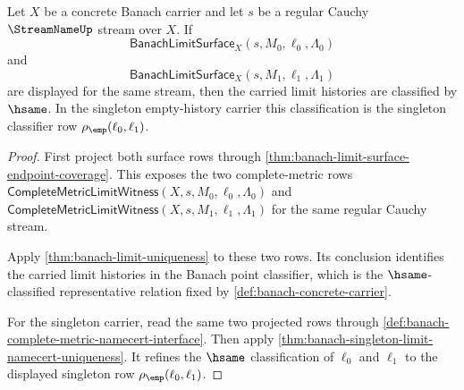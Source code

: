 \begin{theorem}
\label{thm:banach-limit-surface-uniqueness}
Let $X$ be a concrete Banach carrier and let $s$ be a regular Cauchy
$\StreamNameUp$ stream over $X$. If
$$
\mathsf{BanachLimitSurface}_X(s,M_0,\ell_0,\Lambda_0)
$$
and
$$
\mathsf{BanachLimitSurface}_X(s,M_1,\ell_1,\Lambda_1)
$$
are displayed for the same stream, then the carried limit histories are
classified by $\hsame$. In the singleton empty-history carrier this
classification is the singleton classifier row
$\rho_{\emp}(\ell_0,\ell_1)$.
\end{theorem}
\begin{proof}
First project both surface rows through
\autoref{thm:banach-limit-surface-endpoint-coverage}. This exposes the two
complete-metric rows
$\mathsf{CompleteMetricLimitWitness}(X,s,M_0,\ell_0,\Lambda_0)$ and
$\mathsf{CompleteMetricLimitWitness}(X,s,M_1,\ell_1,\Lambda_1)$ for the same
regular Cauchy stream.

Apply \autoref{thm:banach-limit-uniqueness} to these two rows. Its conclusion
identifies the carried limit histories in the Banach point classifier, which
is the $\hsame$-classified representative relation fixed by
\autoref{def:banach-concrete-carrier}.

For the singleton carrier, read the same two projected rows through
\autoref{def:banach-complete-metric-namecert-interface}. Then apply
\autoref{thm:banach-singleton-limit-namecert-uniqueness}. It refines the
$\hsame$ classification of $\ell_0$ and $\ell_1$ to the displayed singleton
row $\rho_{\emp}(\ell_0,\ell_1)$.
\end{proof}

